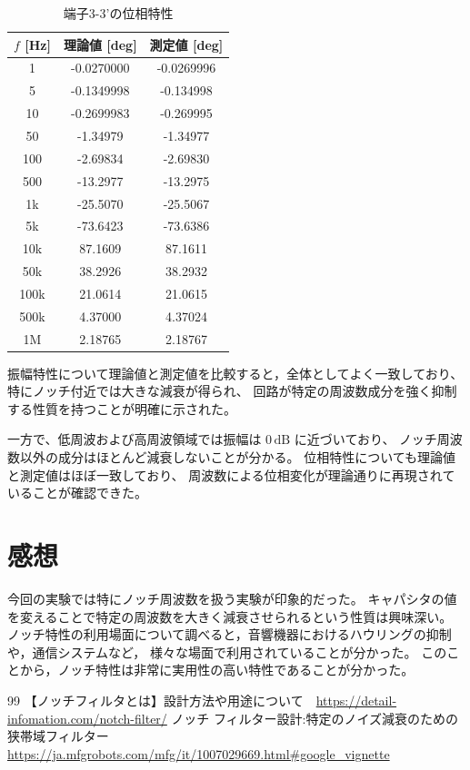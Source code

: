 \documentclass[article]{jlreq}
\begin{document}
\begin{table}[H]
\centering
\caption{端子3-3'の位相特性}
\begin{tabular}{ccc}
\hline
$f$ [Hz] & 理論値 [deg] & 測定値 [deg] \\
\hline
1       & -0.0270000 & -0.0269996 \\
5       & -0.1349998 & -0.134998 \\
10      & -0.2699983 & -0.269995 \\
50      & -1.34979  & -1.34977 \\
100     & -2.69834  & -2.69830 \\
500     & -13.2977  & -13.2975 \\
1k      & -25.5070  & -25.5067 \\
5k      & -73.6423  & -73.6386 \\
10k     & 87.1609   & 87.1611 \\
50k     & 38.2926   & 38.2932 \\
100k    & 21.0614   & 21.0615 \\
500k    & 4.37000   & 4.37024 \\
1M      & 2.18765   & 2.18767 \\
\hline
\end{tabular}
\end{table}

振幅特性について理論値と測定値を比較すると，全体としてよく一致しており、
特にノッチ付近では大きな減衰が得られ、
回路が特定の周波数成分を強く抑制する性質を持つことが明確に示された。

一方で、低周波および高周波領域では振幅は $0\,\mathrm{dB}$ に近づいており、
ノッチ周波数以外の成分はほとんど減衰しないことが分かる。
位相特性についても理論値と測定値はほぼ一致しており、
周波数による位相変化が理論通りに再現されていることが確認できた。
\section{感想}
今回の実験では特にノッチ周波数を扱う実験が印象的だった。
キャパシタの値を変えることで特定の周波数を大きく減衰させられるという性質は興味深い。
ノッチ特性の利用場面について調べると，音響機器におけるハウリングの抑制や，通信システムなど，
様々な場面で利用されていることが分かった。
このことから，ノッチ特性は非常に実用性の高い特性であることが分かった。
\begin{thebibliography}{99}
    【ノッチフィルタとは】設計方法や用途について　\url{https://detail-infomation.com/notch-filter/}
    ノッチ フィルター設計:特定のノイズ減衰のための狭帯域フィルター　\url{https://ja.mfgrobots.com/mfg/it/1007029669.html#google_vignette}

\end{thebibliography}
\end{document}
